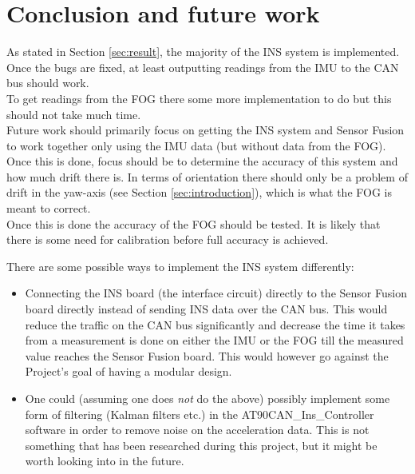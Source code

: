 
\section{Conclusion and future work}\label{sec:conclusion}
As stated in Section \ref{sec:result}, the majority of the INS system is implemented. Once the bugs are fixed, at least outputting readings from the IMU to the CAN bus should work. \\
To get readings from the FOG there some more implementation to do but this should not take much time. \\ %
Future work should primarily focus on getting the INS system and Sensor Fusion to work together only using the IMU data (but without data from the FOG). Once this is done, focus should be to determine the accuracy of this system and how much drift there is. In terms of orientation there should only be a problem of drift in the yaw-axis (see Section \ref{sec:introduction}), which is what the FOG is meant to correct. \\
Once this is done the accuracy of the FOG should be tested. It is likely that there is some need for calibration before full accuracy is achieved.

There are some possible ways to implement the INS system differently:

\begin{itemize}
\item Connecting the INS board (the interface circuit) directly to the Sensor Fusion board directly instead of sending INS data over the CAN bus. This would reduce the traffic on the CAN bus significantly and decrease the time it takes from a measurement is done on either the IMU or the FOG till the measured value reaches the Sensor Fusion board. This would however go against the Project's goal of having a modular design.

\item One could (assuming one does \emph{not} do the above) possibly implement some form of filtering (Kalman filters etc.) in the AT90CAN\_Ins\_Controller software in order to remove noise on the acceleration data. This is not something that has been researched during this project, but it might be worth looking into in the future.

\end{itemize}




